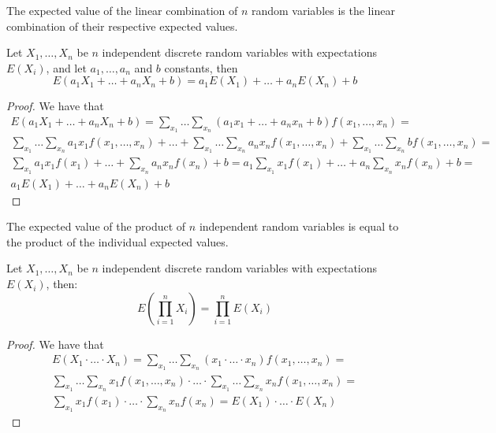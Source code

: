 The expected value of the linear combination of $n$ random variables is the linear combination of their respective expected values.

\begin{proposition}
Let $X_{1}, \ldots, X_{n}$ be $n$ independent discrete random variables with expectations $E\left(X_{i}\right)$, and let $a_1, \ldots, a_n$ and $b$ constants, then
\[
E\left(a_{1}X_{1}+\ldots+a_{n}X_{n}+b\right)=a_{1}E\left(X_{1}\right)+\ldots+a_{n}E\left(X_{n}\right)+b
\]
\end{proposition}
\begin{proof}
We have that
\begin{multline}
E \left(a_1 X_1 + \ldots + a_n X_n +b \right) = 
\sum_{x_1} \ldots \sum_{x_n} \left(a_ 1 x_1 + \ldots + a_n x_n + b  \right) f\left(x_1, \ldots, x_n \right) = \\
\sum_{x_1} \ldots \sum_{x_n} a_1 x_1 f\left(x_1, \ldots, x_n \right) + \ldots + \sum_{x_1} \ldots \sum_{x_n} a_n x_n f\left(x_1, \ldots, x_n \right) + \sum_{x_1} \ldots \sum_{x_n} b f\left(x_1, \ldots, x_n \right) = \\
\sum_{x_1} a_1 x_1 f\left(x_1\right) + \ldots + \sum_{x_n} a_n x_n f\left( x_n \right) + b = 
a_1 \sum_{x_1} x_1 f\left(x_1\right) + \ldots + a_n \sum_{x_n} x_n f\left( x_n \right) + b = \\
a_1 E\left(X_1\right) + \ldots + a_n E\left(X_n\right) + b
\end{multline}
\end{proof}

The expected value of the product of $n$ independent random variables is equal to the product of the individual expected values.

\begin{proposition}
Let $X_{1}, \ldots, X_{n}$ be $n$ independent discrete random variables with expectations $E\left(X_{i}\right)$, then:
\[
E\left(\prod_{i=1}^{n}X_{i}\right)=\prod_{i=1}^{n}E\left(X_{i}\right)
\]
\end{proposition}
\begin{proof}
We have that
\begin{multline}
E \left(X_1  \cdot \ldots \cdot X_n  \right) = 
\sum_{x_1} \ldots \sum_{x_n} \left(x_1 \cdot \ldots \cdot x_n  \right) f\left(x_1, \ldots, x_n \right) = \\
\sum_{x_1} \ldots \sum_{x_n} x_1 f\left(x_1, \ldots, x_n \right) \cdot \ldots \cdot \sum_{x_1} \ldots \sum_{x_n} x_n f\left(x_1, \ldots, x_n \right) = \\
\sum_{x_1} x_1 f\left(x_1\right) \cdot \ldots \cdot \sum_{x_n} x_n f\left( x_n \right) = 
E \left( X_1 \right) \cdot \ldots \cdot E \left( X_n \right)
\end{multline}
\end{proof}

